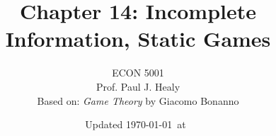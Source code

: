 

\title[Incomplete Information: Static]{Chapter 14: Incomplete Information, Static Games}
\author[ECON 5001]{ECON 5001\\Prof. Paul J. Healy\\Based on: \textit{Game Theory} by Giacomo Bonanno} \color{metrop}
\institute[OSU]{}
\date[]{\vfill {\tiny Updated \today\ at\ \DTMcurrenttime}}

%
